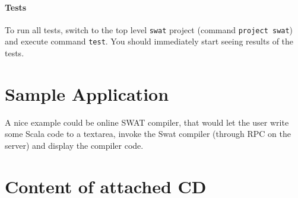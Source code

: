 \documentclass[12pt,a4paper]{report}
\begin{document}
\subsubsection*{Tests}

To run all tests, switch to the top level \texttt{swat} project (command \texttt{project swat}) and execute command \texttt{test}. You should immediately start seeing results of the tests.


\chapter{Sample Application}

A nice example could be online SWAT compiler, that would let the user write some Scala code to a textarea, invoke the Swat compiler (through RPC on the server) and display the compiler code.



\chapter{Content of attached CD}





\printnomenclature
\end{document}
